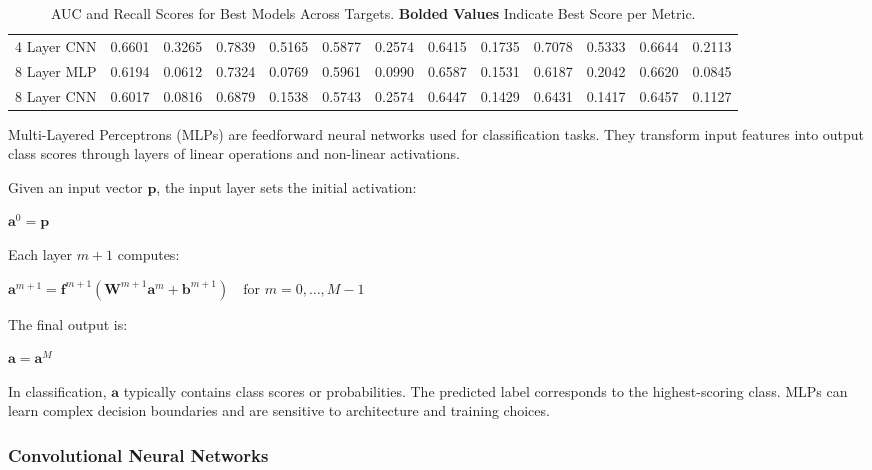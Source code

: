 \documentclass[bst/sn-nature]{sn-jnl}
\begin{document}
\begin{multicols}{2}
\begin{table}
\begin{tabular}{|l|cc|cc|cc|cc|cc|cc|}
4 Layer CNN & 0.6601 & 0.3265 & 0.7839 & 0.5165 & 0.5877 & 0.2574 & 0.6415 & 0.1735 & 0.7078 & 0.5333 & 0.6644 & 0.2113 \\
\rowcolor[gray]{0.9} 8 Layer MLP & 0.6194 & 0.0612 & 0.7324 & 0.0769 & 0.5961 & 0.0990 & 0.6587 & 0.1531 & 0.6187 & 0.2042 & 0.6620 & 0.0845 \\
8 Layer CNN & 0.6017 & 0.0816 & 0.6879 & 0.1538 & 0.5743 & 0.2574 & 0.6447 & 0.1429 & 0.6431 & 0.1417 & 0.6457 & 0.1127 \\
\hline
\end{tabular}
\caption{AUC and Recall Scores for Best Models Across Targets. \textbf{Bolded Values} Indicate Best Score per Metric.} 
\label{tab:tables_result}
\end{table}


\quad Multi-Layered Perceptrons (MLPs) are feedforward neural networks used for classification tasks. They transform input features into output class scores through layers of linear operations and non-linear activations.

Given an input vector $\mathbf{p}$, the input layer sets the initial activation: \\

\begin{center} $\mathbf{a}^{0} = \mathbf{p}$ \vspace{0.3cm} \end{center}

Each layer $m+1$ computes: \\

\begin{center} $\mathbf{a}^{m+1} = \mathbf{f}^{m+1}(\mathbf{W}^{m+1} \mathbf{a}^{m} + \mathbf{b}^{m+1}) \quad \text{for } m = 0, \dots, M-1$ \vspace{0.3cm} \end{center}

The final output is: \\

\begin{center} $\mathbf{a} = \mathbf{a}^{M}$ \vspace{0.3cm} \end{center}

In classification, $\mathbf{a}$ typically contains class scores or probabilities. The predicted label corresponds to the highest-scoring class. MLPs can learn complex decision boundaries and are sensitive to architecture and training choices.

\subsubsection{Convolutional Neural Networks\cite{cnn}}


\end{multicols}
\end{document}
